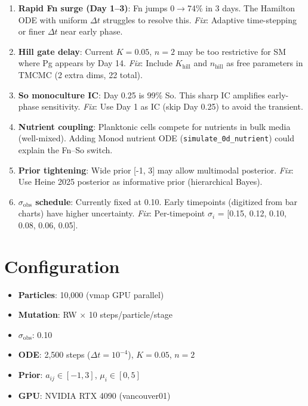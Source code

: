 \documentclass[11pt,a4paper]{article}
\begin{document}
\begin{enumerate}
\item \textbf{Rapid Fn surge (Day 1--3)}: Fn jumps 0$\to$74\% in 3 days.
The Hamilton ODE with uniform $\Delta t$ struggles to resolve this.
\textit{Fix}: Adaptive time-stepping or finer $\Delta t$ near early phase.

\item \textbf{Hill gate delay}: Current $K=0.05$, $n=2$ may be too restrictive
for SM where Pg appears by Day 14. \textit{Fix}: Include $K_\text{hill}$ and $n_\text{hill}$
as free parameters in TMCMC (2 extra dims, 22 total).

\item \textbf{So monoculture IC}: Day 0.25 is 99\% So. This sharp IC amplifies
early-phase sensitivity. \textit{Fix}: Use Day 1 as IC (skip Day 0.25) to
avoid the transient.

\item \textbf{Nutrient coupling}: Planktonic cells compete for nutrients in
bulk media (well-mixed). Adding Monod nutrient ODE (\texttt{simulate\_0d\_nutrient})
could explain the Fn--So switch.

\item \textbf{Prior tightening}: Wide prior [-1, 3] may allow multimodal
posterior. \textit{Fix}: Use Heine 2025 posterior as informative prior
(hierarchical Bayes).

\item \textbf{$\sigma_\text{obs}$ schedule}: Currently fixed at 0.10.
Early timepoints (digitized from bar charts) have higher uncertainty.
\textit{Fix}: Per-timepoint $\sigma_i$ = [0.15, 0.12, 0.10, 0.08, 0.06, 0.05].
\end{enumerate}

\section{Configuration}
\begin{itemize}
\item \textbf{Particles}: 10,000 (vmap GPU parallel)
\item \textbf{Mutation}: RW $\times$ 10 steps/particle/stage
\item \textbf{$\sigma_\text{obs}$}: 0.10
\item \textbf{ODE}: 2,500 steps ($\Delta t = 10^{-4}$), $K=0.05$, $n=2$
\item \textbf{Prior}: $a_{ij} \in [-1, 3]$, $\mu_i \in [0, 5]$
\item \textbf{GPU}: NVIDIA RTX 4090 (vancouver01)
\end{itemize}
\end{document}
